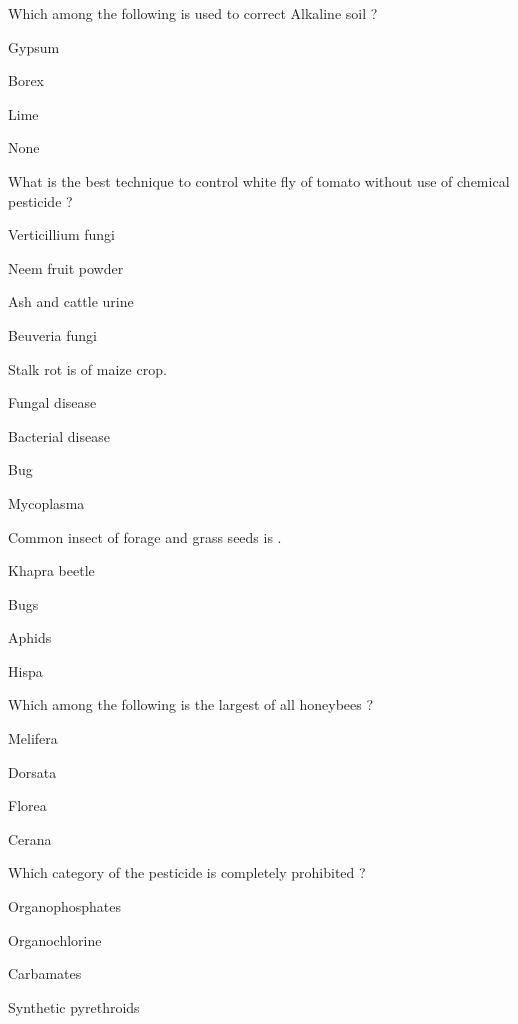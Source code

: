 \begin{questions}
\question Which among the following is used to correct Alkaline soil ?
\begin{items}
\item* Gypsum
\item Borex
\item Lime
\item None
\end{items}

\question What is the best technique to control white fly of tomato without use of chemical pesticide ?
\begin{items}
\item* Verticillium fungi
\item Neem fruit powder
\item Ash and cattle urine
\item Beuveria fungi
\end{items}

\question Stalk rot is \fillin[][3cm] of maize crop.
\begin{items}
\item Fungal disease
\item* Bacterial disease
\item Bug
\item Mycoplasma
\end{items}

\question Common insect of forage and grass seeds is \fillin[][3cm].
\begin{items}
\item* Khapra beetle
\item Bugs
\item Aphids
\item Hispa
\end{items}

\question Which among the following is the largest of all honeybees ?
\begin{items}
\item Melifera
\item* Dorsata
\item Florea
\item Cerana
\end{items}

\question Which category of the pesticide is completely prohibited ?
\begin{items}
\item Organophosphates
\item* Organochlorine
\item Carbamates
\item Synthetic pyrethroids
\end{items}


\end{questions}
